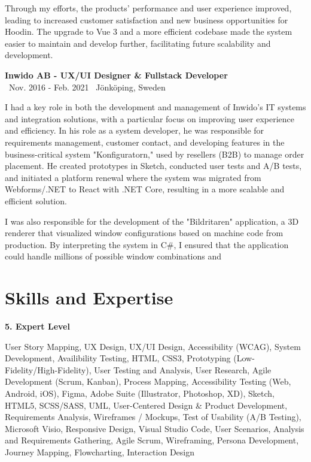 \documentclass[a4paper,10pt]{article}
\begin{document}
Through my efforts, the products' performance and user experience improved, leading to increased customer satisfaction and new business opportunities for Hoodin. The upgrade to Vue 3 and a more efficient codebase made the system easier to maintain and develop further, facilitating future scalability and development.

\vspace{0.5cm}
\textbf{Inwido AB - UX/UI Designer \& Fullstack Developer}\\
\normalsize \faCalendar \ Nov. 2016 - Feb. 2021 \quad \faMapMarker \ Jönköping, Sweden

I had a key role in both the development and management of Inwido's IT systems and integration solutions, with a particular focus on improving user experience and efficiency. In his role as a system developer, he was responsible for requirements management, customer contact, and developing features in the business-critical system "Konfiguratorn," used by resellers (B2B) to manage order placement. He created prototypes in Sketch, conducted user tests and A/B tests, and initiated a platform renewal where the system was migrated from Webforms/.NET to React with .NET Core, resulting in a more scalable and efficient solution.

I was also responsible for the development of the "Bildritaren" application, a 3D renderer that visualized window configurations based on machine code from production. By interpreting the system in C\#, I ensured that the application could handle millions of possible window combinations and


\section*{Skills and Expertise}

\textbf{5. Expert Level}

User Story Mapping, UX Design, UX/UI Design, Accessibility (WCAG), System Development, Availibility Testing, HTML, CSS3, Prototyping (Low-Fidelity/High-Fidelity), User Testing and Analysis, User Research, Agile Development (Scrum, Kanban), Process Mapping, Accessibility Testing (Web, Android, iOS), Figma, Adobe Suite (Illustrator, Photoshop, XD), Sketch, HTML5, SCSS/SASS, UML, User-Centered Design \& Product Development, Requirements Analysis, Wireframes / Mockups, Test of Usability (A/B Testing), Microsoft Visio, Responsive Design, Visual Studio Code, User Scenarios, Analysis and Requirements Gathering, Agile Scrum, Wireframing, Persona Development, Journey Mapping, Flowcharting, Interaction Design
\vspace{0.3cm}
\end{document}
